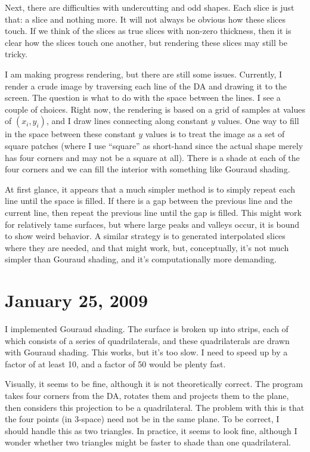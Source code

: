 \documentclass[titlepage,oneside,10pt]{article}
\begin{document}
Next, there are difficulties with undercutting and odd shapes. Each
slice is just that: a slice and nothing more. It will not always be
obvious how these slices touch. If we think of the slices as true
slices with non-zero thickness, then it is clear how the slices touch
one another, but rendering these slices may still be tricky.

I am making progress rendering, but there are still some
issues. Currently, I render a crude image by traversing each line of
the DA and drawing it to the screen. The question is what to do with
the space between the lines. I see a couple of choices. Right now, the
rendering is based on a grid of samples at values of $(x_i,y_i)$, and
I draw lines connecting along constant $y$ values. One way to fill
in the space between these constant $y$ values is to treat the image
as a set of square patches (where I use ``square'' as short-hand since
the actual shape merely has four corners and may not be a square at
all). There is a shade at each of the four corners and we can fill 
the interior with something like Gouraud shading.

At first glance, it appears that a much simpler method is to simply
repeat each line until the space is filled. If there is a gap between
the previous line and the current line, then repeat the previous line
until the gap is filled. This might work for relatively tame surfaces,
but where large peaks and valleys occur, it is bound to show weird
behavior. A similar strategy is to generated interpolated slices where
they are needed, and that might work, but, conceptually, it's not much
simpler than Gouraud shading, and it's computationally more demanding.

\section{January 25, 2009}

I implemented Gouraud shading. The surface is broken up into strips,
each of which consists of a series of quadrilaterals, and these
quadrilaterals are drawn with Gouraud shading. This works, but it's
too slow. I need to speed up by a factor of at least 10, and a factor
of 50 would be plenty fast.

Visually, it seems to be fine, although it is not theoretically
correct. The program takes four corners from the DA, rotates them and
projects them to the plane, then considers this projection to be a
quadrilateral. The problem with this is that the four points (in
3-space) need not be in the same plane. To be correct, I should handle
this as two triangles. In practice, it seems to look fine, although I
wonder whether two triangles might be faster to shade than one
quadrilateral. 
\end{document}
